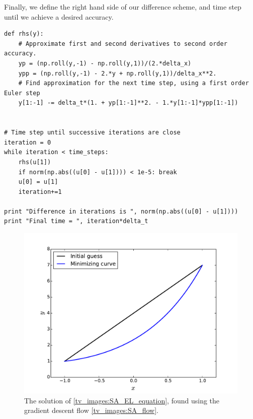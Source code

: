 Finally, we define the right hand side of our difference scheme, and time step until we 
achieve a desired accuracy. 
\begin{lstlisting}
def rhs(y):
	# Approximate first and second derivatives to second order accuracy.
	yp = (np.roll(y,-1) - np.roll(y,1))/(2.*delta_x)
	ypp = (np.roll(y,-1) - 2.*y + np.roll(y,1))/delta_x**2.
	# Find approximation for the next time step, using a first order Euler step
	y[1:-1] -= delta_t*(1. + yp[1:-1]**2. - 1.*y[1:-1]*ypp[1:-1])


# Time step until successive iterations are close
iteration = 0
while iteration < time_steps:
	rhs(u[1])
	if norm(np.abs((u[0] - u[1]))) < 1e-5: break
	u[0] = u[1]
	iteration+=1

print "Difference in iterations is ", norm(np.abs((u[0] - u[1])))
print "Final time = ", iteration*delta_t
\end{lstlisting}

\begin{figure}
\centering
\includegraphics[width=\textwidth]{min_surface_area.pdf}
\caption{The solution of \eqref{tv_images:SA_EL_equation}, found using the gradient descent flow \eqref{tv_images:SA_flow}.}
\label{fig:tv_images:SA_image}
\end{figure}


